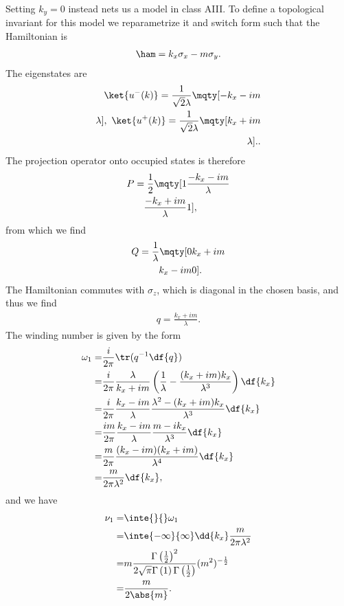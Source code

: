 Setting $k_{y} = 0$ instead nets us a model in class AIII. To define a topological invariant for this model we reparametrize it and switch form such that the Hamiltonian is
\begin{align*}
	\ham = k_{x}\sigma_{x} - m\sigma_{y}.
\end{align*}
The eigenstates are
\begin{align*}
	\ket{u^{-}(k)} = \frac{1}{\sqrt{2}\lambda}\mqty[
		-k_{x} - im \\
		\lambda
	],\ \ket{u^{+}(k)} = \frac{1}{\sqrt{2}\lambda}\mqty[
		k_{x} + im \\
		\lambda
	]..
\end{align*}
The projection operator onto occupied states is therefore
\begin{align*}
	P = \frac{1}{2}\mqty[
		1                           & \frac{-k_{x} - im}{\lambda} \\
		\frac{-k_{x} + im}{\lambda} & 1
	],
\end{align*}
from which we find
\begin{align*}
	Q = \frac{1}{\lambda}\mqty[
		0          & k_{x} + im \\
		k_{x} - im & 0
	].
\end{align*}
The Hamiltonian commutes with $\sigma_{z}$, which is diagonal in the chosen basis, and thus we find
\begin{align*}
	q = \frac{k_{x} + im}{\lambda}.
\end{align*}
The winding number is given by the form
\begin{align*}
	\omega_{1} =& \frac{i}{2\pi}\tr(q^{-1}\df{q}) \\
	           =& \frac{i}{2\pi}\frac{\lambda}{k_{x} + im}\left(\frac{1}{\lambda} - \frac{(k_{x} + im)k_{x}}{\lambda^{3}}\right)\df{k_{x}} \\
	           =& \frac{i}{2\pi}\frac{k_{x} - im}{\lambda}\frac{\lambda^{2} - (k_{x} + im)k_{x}}{\lambda^{3}}\df{k_{x}} \\
	           =& \frac{im}{2\pi}\frac{k_{x} - im}{\lambda}\frac{m - ik_{x}}{\lambda^{3}}\df{k_{x}} \\
	           =& \frac{m}{2\pi}\frac{(k_{x} - im)(k_{x} + im)}{\lambda^{4}}\df{k_{x}} \\
	           =& \frac{m}{2\pi\lambda^{2}}\df{k_{x}},
\end{align*}
and we have
\begin{align*}
	\nu_{1} =& \inte{}{}\omega_{1} \\
	        =& \inte{-\infty}{\infty}\dd{k_{x}}\frac{m}{2\pi\lambda^{2}} \\
	        =& m\frac{\Gamma\left(\frac{1}{2}\right)^{2}}{2\sqrt{\pi}\Gamma\left(1\right)\Gamma\left(\frac{1}{2}\right)}(m^{2})^{-\frac{1}{2}} \\
	        =& \frac{m}{2\abs{m}}.
\end{align*}
